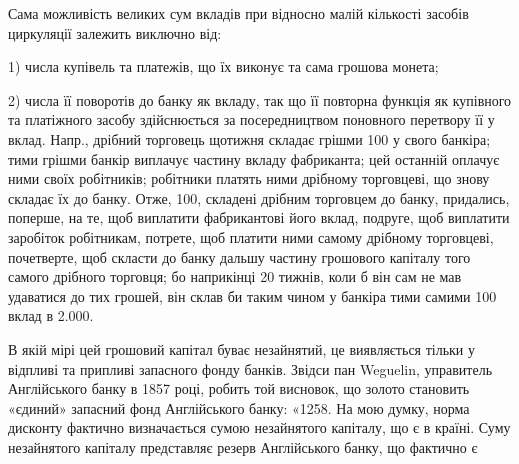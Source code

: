 Сама можливість великих сум вкладів при відносно малій кількості засобів
циркуляції залежить виключно від:

1) числа купівель та платежів, що їх виконує та сама грошова монета;

2) числа її поворотів до банку як вкладу, так що її повторна функція як
купівного та платіжного засобу здійснюється за посередництвом поновного перетвору
її у вклад. Напр., дрібний торговець щотижня складає грішми 100
у свого банкіра; тими грішми банкір виплачує частину вкладу фабриканта;
цей останній оплачує ними своїх робітників; робітники платять ними дрібному
торговцеві, що знову складає їх до банку. Отже, 100, складені дрібним
торговцем до банку, придались, поперше, на те, щоб виплатити фабрикантові
його вклад, подруге, щоб виплатити заробіток робітникам, потрете, щоб платити
ними самому дрібному торговцеві, почетверте, щоб скласти до банку дальшу
частину грошового капіталу того самого дрібного торговця; бо наприкінці
20 тижнів, коли б він сам не мав удаватися до тих грошей, він склав би таким
чином у банкіра тими самими 100 вклад в \num{2.000}.

В якій мірі цей грошовий капітал буває незайнятий, це виявляється тільки
у відпливі та припливі запасного фонду банків. Звідси пан Weguelin, управитель
Англійського банку в 1857 році, робить той висновок, що золото становить
«єдиний» запасний фонд Англійського банку: «1258. На мою думку, норма
дисконту фактично визначається сумою незайнятого капіталу, що є в країні. Суму
незайнятого капіталу представляє резерв Англійського банку, що фактично є
\parbreak{}  %

